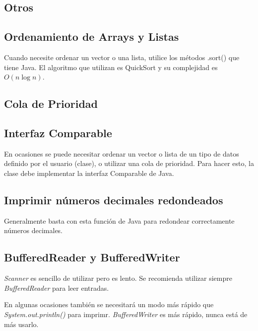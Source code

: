 \documentclass{article}
\begin{document}
\begin{multicols}{2}
\section{Otros}
	\subsection{Ordenamiento de Arrays y Listas}
	Cuando necesite ordenar un vector o una lista, utilice los métodos .sort() que tiene 		Java. El algoritmo que utilizan es QuickSort y su complejidad es \( O(n\log n) \).	
	
	
	\subsection{Cola de Prioridad}
	
	\subsection{Interfaz Comparable}
	En ocasiones se puede necesitar ordenar un vector o lista de un tipo de datos definido por el usuario (clase), o utilizar una cola de prioridad. Para hacer esto, la clase debe implementar la interfaz Comparable de Java.
	
	\subsection{Imprimir números decimales redondeados}
	Generalmente basta con esta función de Java para redondear correctamente números decimales.	
	
	
	\subsection{BufferedReader y BufferedWriter}
	\emph{Scanner} es sencillo de utilizar pero es lento. Se recomienda utilizar siempre \emph{BufferedReader} para leer entradas.
	
	En algunas ocasiones también se necesitará un modo más rápido que \emph{System.out.println()} para imprimr. \emph{BufferedWriter} es más rápido, nunca está de más usarlo.
	
\end{multicols}	
\end{document}
